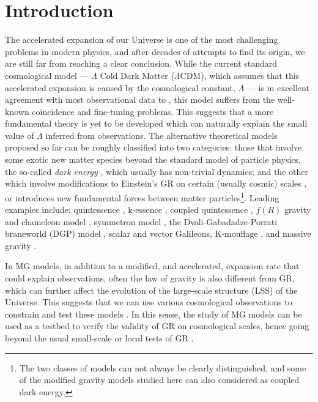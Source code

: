 \section{Introduction}
\label{sec:intro}

The accelerated expansion of our Universe \cite{SupernovaCosmologyProject:1998vns,SupernovaSearchTeam:1998fmf} is one of the most challenging problems in modern physics, and after decades of attempts to find its origin, we are still far from reaching a clear conclusion. 
While the current standard cosmological model --- $\Lambda$ Cold Dark Matter ($\Lambda$CDM), which assumes that this accelerated expansion is caused by the cosmological constant, $\Lambda$ --- is in excellent agreement with most observational data to , this model suffers from the well-known coincidence and fine-tuning problems. This suggests that a more fundamental theory is yet to be developed which can naturally explain the small value of $\Lambda$ inferred from observations. The alternative theoretical models proposed so far can be roughly classified into two categories: those that involve some exotic new matter species beyond the standard model of particle physics, the so-called \textit{dark energy} \cite{Copeland:2006wr}, which usually has non-trivial dynamics; and the other which involve modifications to Einstein's \ac{GR} on certain (usually cosmic) scales \citep{Clifton:2011jh,2015PhR...568....1J,Koyama:2020zce}, or introduces new fundamental forces between matter particles\footnote{The two classes of models can not always be clearly distinguished, and some of the modified gravity models studied here can also considered as coupled dark energy.}. Leading examples include: quintessence \cite{Ratra:1988_quintessence,Wetterich:1988_quintessence,Zlatev:1998tr_quintessence,Steinhardt:1999nw_quintessence}, k-essence \cite{Armendariz-Picon:2000nqq:kessence,Armendariz-Picon:2000ulo_kessense}, coupled quintessence \cite{Amendola:1999er}, $f(R)$ gravity \cite{Sotiriou:2008rp,DeFelice:2010aj} and chameleon model  \cite{Khoury:2003aq,Khoury:2003rn,Mota:2006fz,Brax:2008hh}, symmetron model \cite{Hinterbichler:2010es,Hinterbichler:2011ca}, the Dvali-Gabadadze-Porrati braneworld (DGP) model \cite{Davis:2011pj}, scalar \cite{Nicolis:2008in,Deffayet:2009wt} and vector \cite{Heisenberg:2014_Proca,Allys:2015sht_Proca,BeltranJimenez:2016rff_Proca} Galileons, K-mouflage \cite{Babichev:2009ee}, and massive gravity \cite[e.g.,][]{Hinterbichler:2011tt_massive_gravity}.

In \ac{MG} models, in addition to a modified, and accelerated,  expansion rate that could explain observations, often the law of gravity is also different from \ac{GR}, which can further affect the evolution of the large-scale structure (LSS) of the Universe. This suggests that we can use various cosmological observations to constrain and test these models \citep[e.g.,][]{Koyama:2015vza,Ferreira:2019xrr,Baker:2019gxo}.
In this sense, the study of \ac{MG} models can be used as a testbed to verify the validity of \ac{GR} on cosmological scales, hence going beyond the usual small-scale or local tests of \ac{GR} \cite{Will:2014_GR_LRR}.


